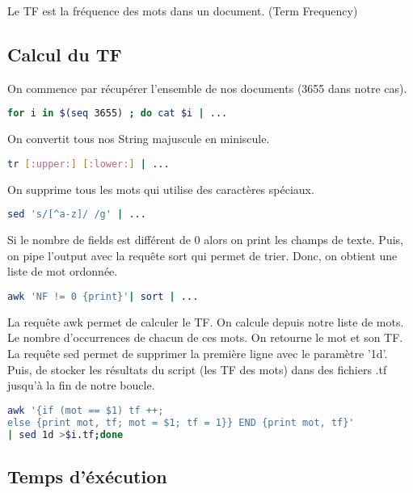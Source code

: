 \documentclass{article}
\begin{document}
Le TF est la fréquence des mots dans un document. (Term Frequency)

\subsection{Calcul du TF}

On commence par récupérer l'ensemble de nos documents (3655 dans notre cas).

\begin{lstlisting}[language=bash,caption={Bouclage}]
for i in $(seq 3655) ; do cat $i | ...
\end{lstlisting}

On convertit tous nos String majuscule en miniscule.

\begin{lstlisting}[language=bash,caption={Miniscule}]
tr [:upper:] [:lower:] | ...
\end{lstlisting}

On supprime tous les mots qui utilise des caractères spéciaux.

\begin{lstlisting}[language=bash,caption={Caractères spéciaux}]
sed 's/[^a-z]/ /g' | ...
\end{lstlisting}


Si le nombre de fields est différent de 0 alors on print les champs de texte. Puis, on pipe l'output avec la requête sort qui permet de trier. Donc, on obtient une liste de mot ordonnée.

\begin{lstlisting}[language=bash,caption={Liste de mots triés}]
awk 'NF != 0 {print}'| sort | ...
\end{lstlisting}

La requête awk permet de calculer le TF. On calcule depuis notre liste de mots. Le nombre d'occurrences de chacun de ces mots. On retourne le mot et son TF.
La requête sed permet de supprimer la première ligne avec le paramètre '1d'. Puis, de stocker les résultats du script (les TF des mots) dans des fichiers .tf jusqu'à la fin de notre boucle.

\begin{lstlisting}[language=bash,caption={Calcul du TF}]
awk '{if (mot == $1) tf ++; 
else {print mot, tf; mot = $1; tf = 1}} END {print mot, tf}' 
| sed 1d >$i.tf;done
\end{lstlisting}

\subsection{Temps d'éxécution}
\end{document}
